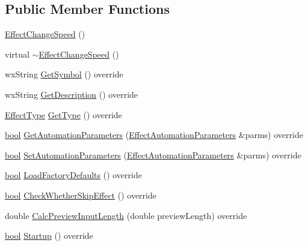 \subsection*{Public Member Functions}
\begin{DoxyCompactItemize}
\item 
\hyperlink{class_effect_change_speed_a2a731afe480dbe8a8ee821839e8101c1}{Effect\+Change\+Speed} ()
\item 
virtual \hyperlink{class_effect_change_speed_a11a69b804975ba13d59c2ec3dee27b88}{$\sim$\+Effect\+Change\+Speed} ()
\item 
wx\+String \hyperlink{class_effect_change_speed_a73f754c6838b6ef5a0686a2ef99cfd46}{Get\+Symbol} () override
\item 
wx\+String \hyperlink{class_effect_change_speed_a81cebc5b6742cdc56d259e3f5af5545a}{Get\+Description} () override
\item 
\hyperlink{_effect_interface_8h_a4809a7bb3fd1a421902a667cc1405d43}{Effect\+Type} \hyperlink{class_effect_change_speed_a1ec56c9482397b9229e8e24c9bba0044}{Get\+Type} () override
\item 
\hyperlink{mac_2config_2i386_2lib-src_2libsoxr_2soxr-config_8h_abb452686968e48b67397da5f97445f5b}{bool} \hyperlink{class_effect_change_speed_a8bfe8f90ed7eded9defb444837c58087}{Get\+Automation\+Parameters} (\hyperlink{class_effect_automation_parameters}{Effect\+Automation\+Parameters} \&parms) override
\item 
\hyperlink{mac_2config_2i386_2lib-src_2libsoxr_2soxr-config_8h_abb452686968e48b67397da5f97445f5b}{bool} \hyperlink{class_effect_change_speed_adaa5d527590d5e8662223834c407f22b}{Set\+Automation\+Parameters} (\hyperlink{class_effect_automation_parameters}{Effect\+Automation\+Parameters} \&parms) override
\item 
\hyperlink{mac_2config_2i386_2lib-src_2libsoxr_2soxr-config_8h_abb452686968e48b67397da5f97445f5b}{bool} \hyperlink{class_effect_change_speed_a182c5a71e64fbe93bc1acb7f55d9693e}{Load\+Factory\+Defaults} () override
\item 
\hyperlink{mac_2config_2i386_2lib-src_2libsoxr_2soxr-config_8h_abb452686968e48b67397da5f97445f5b}{bool} \hyperlink{class_effect_change_speed_a56dde18b114e9481fa76a55646ad1a9b}{Check\+Whether\+Skip\+Effect} () override
\item 
double \hyperlink{class_effect_change_speed_a0e76450283c52767305aa21c411e74bc}{Calc\+Preview\+Input\+Length} (double preview\+Length) override
\item 
\hyperlink{mac_2config_2i386_2lib-src_2libsoxr_2soxr-config_8h_abb452686968e48b67397da5f97445f5b}{bool} \hyperlink{class_effect_change_speed_ad4d699ee2c50bd99186088facd32fd2c}{Startup} () override

\end{DoxyCompactItemize}
